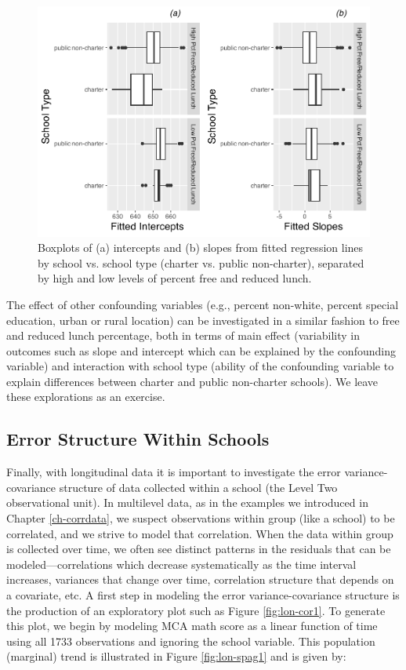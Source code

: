 \documentclass[
]{krantz}
\begin{document}
\begin{figure}

{\centering \includegraphics[width=0.6\linewidth]{bookdown-BeyondMLR_files/figure-latex/lon-boxmat1-1} 

}

\caption{Boxplots of (a) intercepts and (b) slopes from fitted regression lines by school vs. school type (charter vs. public non-charter), separated by high and low levels of percent free and reduced lunch.}\label{fig:lon-boxmat1}
\end{figure}

The effect of other confounding variables (e.g., percent non-white, percent special education, urban or rural location) can be investigated in a similar fashion to free and reduced lunch percentage, both in terms of main effect (variability in outcomes such as slope and intercept which can be explained by the confounding variable) and interaction with school type (ability of the confounding variable to explain differences between charter and public non-charter schools). We leave these explorations as an exercise.

\hypertarget{lineartwostageerror2}{%
\subsection{Error Structure Within Schools}\label{lineartwostageerror2}}

Finally, with longitudinal data it is important to investigate the error variance-covariance structure of data collected within a school (the Level Two observational unit). In multilevel data, as in the examples we introduced in Chapter \ref{ch-corrdata}, we suspect observations within group (like a school) to be correlated, and we strive to model that correlation. When the data within group is collected over time, we often see distinct patterns in the residuals that can be modeled---correlations which decrease systematically as the time interval increases, variances that change over time, correlation structure that depends on a covariate, etc. A first step in modeling the error variance-covariance structure is the production of an exploratory plot such as Figure \ref{fig:lon-cor1}. To generate this plot, we begin by modeling MCA math score as a linear function of time using all 1733 observations and ignoring the school variable. This population (marginal) trend is illustrated in Figure \ref{fig:lon-spag1} and is given by:
\end{document}
